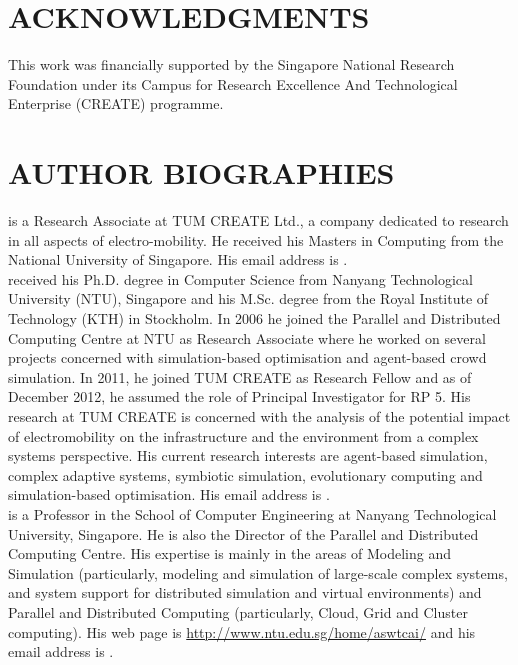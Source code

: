 \documentclass{wscpaperproc}
\theoremstyle{wsc}
\begin{document}
\section*{ACKNOWLEDGMENTS}
This work was financially supported by the Singapore National Research Foundation under its Campus for Research Excellence And Technological Enterprise (CREATE) programme.



\newpage
\section*{AUTHOR BIOGRAPHIES}
 is a Research Associate at TUM CREATE Ltd., a company dedicated to research in all aspects of electro-mobility. He received his Masters in Computing from the National University of Singapore. His email address is .\\

 received his Ph.D. degree in Computer Science from Nanyang Technological University (NTU), Singapore and his M.Sc. degree from the Royal Institute of Technology (KTH) in Stockholm. In 2006 he joined the Parallel and Distributed Computing Centre at NTU as Research Associate where he worked on several projects concerned with simulation-based optimisation and agent-based crowd simulation. In 2011, he joined TUM CREATE as Research Fellow and as of December 2012, he assumed the role of Principal Investigator for RP 5. His research at TUM CREATE is concerned with the analysis of the potential impact of electromobility on the infrastructure and the environment from a complex systems perspective. His current research interests are agent-based simulation, complex adaptive systems, symbiotic simulation, evolutionary computing and simulation-based optimisation. His email address is .\\

 is a Professor in the School of Computer Engineering at Nanyang Technological University, Singapore. He is also the Director of the Parallel and Distributed Computing Centre. His expertise is mainly in the areas of Modeling and Simulation (particularly, modeling and simulation of large-scale complex systems, and system support for distributed simulation and virtual environments) and Parallel and Distributed Computing (particularly, Cloud, Grid and Cluster computing). His web page is \hyperref{http://www.ntu.edu.sg/home/aswtcai/}{}{}{http://www.ntu.edu.sg/home/aswtcai/} and his email address is .\\
\end{document}
